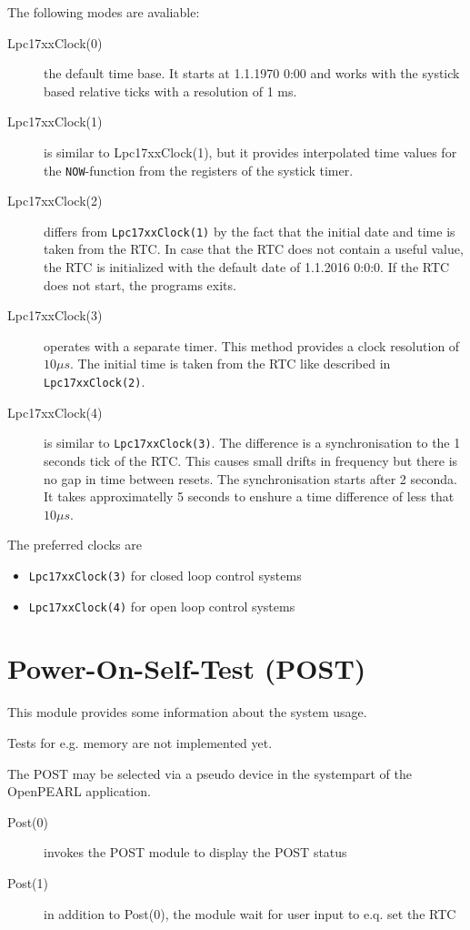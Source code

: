The following modes are avaliable:
\begin{description}
\item[Lpc17xxClock(0)] the default time base. It starts at 1.1.1970 0:00
   and works with the systick based relative ticks with a resolution of 1 ms.
\item[Lpc17xxClock(1)] is similar to Lpc17xxClock(1), but it provides
   interpolated time values  for the \texttt{NOW}-function 
   from the registers of the systick timer.
\item[Lpc17xxClock(2)] differs from \texttt{Lpc17xxClock(1)} by the fact 
    that the initial date and time is taken from the RTC.
    In case that the RTC does not contain a useful value, the RTC
    is initialized with the default date of 1.1.2016 0:0:0.
    If the RTC does not start, the programs exits.
\item[Lpc17xxClock(3)] operates with a separate timer. This method
    provides a clock resolution of $10 \mu s$. The initial time is taken
    from the RTC like described in \texttt{Lpc17xxClock(2)}.
\item[Lpc17xxClock(4)] is similar to \texttt{Lpc17xxClock(3)}. 
    The difference is a synchronisation to the 1 seconds tick of the RTC.
    This causes small drifts in frequency but there is no gap in time 
    between resets. The synchronisation starts after 2 seconda.
    It takes approximatelly  5 seconds to enshure a time difference of
     less that $10\mu s$.
\end{description}

The preferred clocks are 
\begin{itemize}
\item \texttt{Lpc17xxClock(3)} for closed loop control systems
\item \texttt{Lpc17xxClock(4)} for open loop control systems
\end{itemize} 


\section{Power-On-Self-Test (POST)}
This module provides some information about the system usage.

Tests for e.g. memory are not implemented yet.

The POST may be selected via a pseudo device in the systempart of the 
OpenPEARL application.

\begin{description}
\item[Post(0)] invokes the POST module to display the POST status
\item[Post(1)] in addition to Post(0), the module wait for user input
   to e.q. set the RTC
\end{description}


